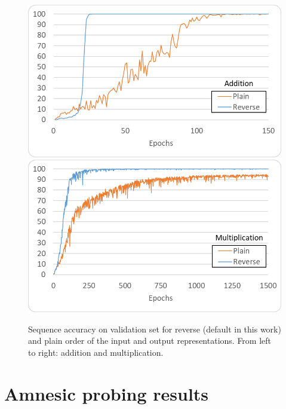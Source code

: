 \documentclass[final,1p,times,authoryear]{elsarticle}
\begin{document}
\begin{figure}[h]
\begin{center}
\includegraphics[scale=1.05]{PlainRevBitsSeqAccAdd.png}
\includegraphics[scale=1.05]{PlainRevBitsSeqAccMul.png}
\end{center}
\caption{Sequence accuracy on validation set for reverse (default in this work) and plain order of the input and output representations. From left to right: addition and multiplication.}
\label{figure:PlainRevBitsSeqAccuracies}
\end{figure}

\section{Amnesic probing results} \label{sec:AppendixD}
\end{document}

